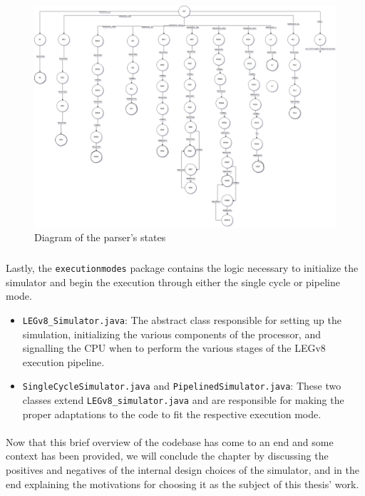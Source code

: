 \begin{landscape}
    \begin{figure}[H]
	\centering
	\includegraphics[width=1.25\textwidth]{img/parser_diagram.png}
	\caption{Diagram of the parser's states}
        \label{fig:oldparser}
\end{figure}
\end{landscape}
\subparagraph{}
Lastly, the \verb|executionmodes| package contains the logic necessary to initialize the simulator and begin the execution through either the single cycle or pipeline mode.
\begin{itemize}
	\item \verb|LEGv8_Simulator.java|: The abstract class responsible for setting up the simulation, initializing the various components of the processor, and signalling the CPU when to perform the various stages of the LEGv8 execution pipeline.
	\item \verb|SingleCycleSimulator.java| and \verb|PipelinedSimulator.java|: These two classes extend \verb|LEGv8_simulator.java| and are responsible for making the proper adaptations to the code to fit the respective execution mode.
\end{itemize}
\paragraph{}
Now that this brief overview of the codebase has come to an end and some context has been provided, we will conclude the chapter by discussing the positives and negatives of the internal design choices of the simulator, and in the end explaining the motivations for choosing it as the subject of this thesis' work.
